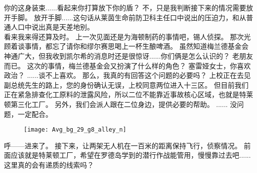 \documentclass[openany]{book}
\begin{document}
\begin{dialogue}
     你的这身装束......看起来你打算放下你的盾？
     不，只是我判断接下来的情况需要放开手脚。
     放开手脚......这句话从莱茵生命前防卫科主任口中说出的压迫力，和从普通人口中说出真是天差地别。
    \\
     看来我来得还算及时。
     上一次见面还是为海顿制药的事情吧，锡人侦探。
     那次光顾着谈事情，都忘了请你和缪尔赛思喝上一杯生酿啤酒。
     虽然知道梅兰德基金会神通广大，但我收到凯尔希的消息时还是很惊讶......你们俩是怎么认识的？
     老朋友而已。
     这次的事情，梅兰德基金会又扮演了什么样的角色？
     塞雷娅女士，你喜欢政治？
     ......谈不上喜欢。
     那么，我真的有回答这个问题的必要吗？
     上校正在去见副总统先生的路上，您的身份确认无误，上校同意两位进入十三区。
     但目前我们正在紧急排查化工原料的泄露风险，所以二位不能靠近事故核心区域，也就是特莱顿第三化工厂。
     另外，我们会派人跟在二位身边，提供必要的帮助。
     ......
     没问题，一定配合。
\end{dialogue}
\par

\begin{figure}[h]
    \centering
    \texttt{[image: Avg\_bg\_29\_g8\_alley\_n]}
\end{figure}
\begin{dialogue}
     呼——进来了。
     接下来，让两架无人机在一百米的距离保持飞行，侦察情况。
     前面应该就是特莱顿工厂，希望在罗德岛学到的潜行作战能管用，慢慢靠过去吧......
     这里真的会有递质的线索吗？
\end{dialogue}
\par
\end{document}
